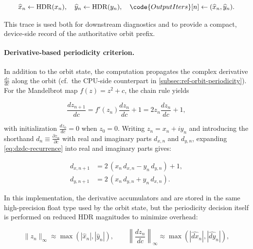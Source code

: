 \begin{equation}
  \widehat{x}_n \leftarrow \mathrm{HDR}(x_n), \quad
  \widehat{y}_n \leftarrow \mathrm{HDR}(y_n), \quad
  \code{OutputIters}[n] \leftarrow (\widehat{x}_n, \widehat{y}_n).
  \label{eq:hdr-extraction}
\end{equation}

This trace is used both for downstream diagnostics and to provide a compact,
device-side record of the authoritative orbit prefix.

\paragraph{Derivative-based periodicity criterion.}

In addition to the orbit state, the computation propagates the complex derivative
\(
\frac{dz}{dc}
\)
along the orbit (cf.\ the CPU-side counterpart in \cref{subsec:ref-orbit-periodicity}). For the Mandelbrot map \(f(z)=z^2+c\), the chain rule yields

\begin{equation}
  \frac{d z_{n+1}}{d c} = f'(z_n)\frac{d z_n}{d c} + 1
  = 2 z_n \frac{d z_n}{d c} + 1,
  \label{eq:dzdc-recurrence}
\end{equation}

with initialization \(\frac{dz_0}{dc}=0\) when \(z_0=0\).
Writing \(z_n = x_n + i y_n\) and introducing the shorthand
\(d_n \equiv \frac{\partial z_n}{\partial c}\) with real and imaginary parts
\(d_{x,n}\) and \(d_{y,n}\), expanding
\eqref{eq:dzdc-recurrence} into real and imaginary parts gives:

\begin{align}
  d_{x,n+1} &= 2\,(x_n\, d_{x,n} - y_n\, d_{y,n}) + 1, \label{eq:dzdc-real}\\
  d_{y,n+1} &= 2\,(x_n\, d_{y,n} + y_n\, d_{x,n}). \label{eq:dzdc-imag}
\end{align}

In this implementation, the derivative accumulators  and
 are stored in the same high-precision float type used by the
orbit state, but the periodicity decision itself is performed on reduced HDR
magnitudes to minimize overhead:

\begin{equation}
  \lVert z_n\rVert_\infty \approx \max(|\widehat{x}_n|, |\widehat{y}_n|), \qquad
  \left\lVert\frac{dz_n}{dc}\right\rVert_\infty \approx \max(|\widehat{d x}_n|, |\widehat{d y}_n|),
  \label{eq:reduced-norms}
\end{equation}

